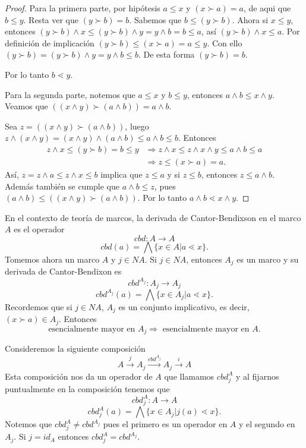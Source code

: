 \begin{proof}
Para la primera parte, por hipótesis $a\leq x$ y $(x\succ a)=a$, de aqui que $b\leq y$. Resta ver que $(y\succ b)=b$. Sabemos que $b\leq (y\succ b)$. Ahora si $x\leq y$, entonces $(y\succ b)\wedge x\leq (y\succ b)\wedge y=y\wedge b=b\leq a$, así $(y\succ b)\wedge x\leq a$. Por definición de implicación $(y\succ b)\leq (x\succ a)=a\leq y$. Con ello $(y\succ b)=(y\succ b)\wedge y=y\wedge b\leq b$. De esta forma $(y\succ b)=b$.

\noindent
Por lo tanto $b\lessdot y$.

Para la segunda parte, notemos que $a\leq x$ y $b\leq y$, entonces $a\wedge b\leq x\wedge y$. Veamos que $((x\wedge y)\succ (a\wedge b))=a\wedge b$.

\noindent
Sea $z=((x\wedge y)\succ (a\wedge b))$, luego $z\wedge (x\wedge y)=(x\wedge y)\wedge (a\wedge b)\leq a\wedge b\leq b$. Entonces 
\begin{equation*}
\begin{split}
    z\wedge x\leq (y\succ b)=b\leq y & \Rightarrow z\wedge x\leq z\wedge x\wedge y\leq a\wedge b\leq a\\
    & \Rightarrow z\leq (x\succ a)=a.
\end{split}
\end{equation*}
Así, $z= z\wedge a\leq z\wedge x\leq b$ implica que $z\leq a$ y si $z\leq b$, entonces $z\leq a\wedge b$. Además también se cumple que $a\wedge b\leq z$, pues $(a\wedge b)\leq ((x\wedge y)\succ (a\wedge b))$. Por lo tanto $a\wedge b\lessdot x\wedge y$.
\end{proof}

En el contexto de teoría de marcos,
la derivada de Cantor-Bendixson en el marco $A$ es el operador
$$cbd:A\to A$$
$$cbd(a)=\bigwedge\{x\in A|a\lessdot x\}.$$
Tomemos ahora un marco $A$ y $j\in NA$. Si $j\in NA$, entonces
$A_j$ es un marco y su derivada de Cantor-Bendixon es
$$cbd^{A_j}:A_j\to A_j$$ 
$$cbd^{A_j}(a)=\bigwedge\{x\in A_j|a\lessdot x\}.$$
Recordemos que si $j\in NA$, $A_j$ es un conjunto implicativo, es decir, $(x\succ a)\in A_j$. Entonces $$\mbox{esencialmente mayor en }A_j\Rightarrow\mbox{ esencialmente mayor en }A.$$

Consideremos la siguiente composición
$$A\xrightarrow{j} A_j\xrightarrow{cbd^{A_j}} A_j\xrightarrow{i} A$$
Esta composición nos da un operador de $A$ que llamamos $cbd_j^{A}$ y al fijarnos puntualmente en la composición tenemos que
$$cbd_j^A:A\to A$$
$$cbd_j^{A}(a)=\bigwedge\{x\in A_j|j(a)\lessdot x\}.$$
Notemos que $cbd_j^{A}\neq cbd^{A_j}$ pues el primero es un operador en $A$ y el segundo en $A_j$. Si $j=id_A$ entonces $cbd_j^{A}= cbd^{A_j}$.

